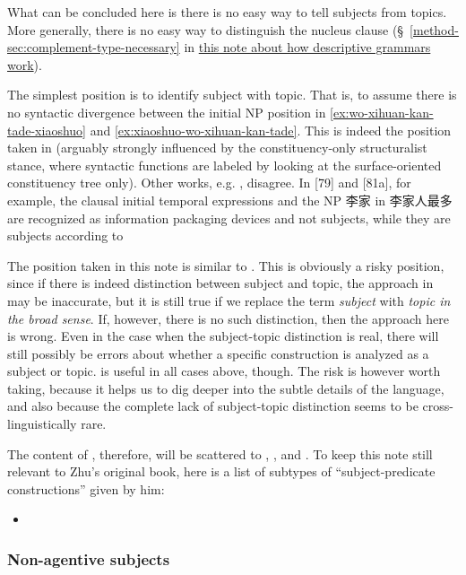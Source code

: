 \documentclass[UTF8, a4paper, oneside, scheme=plain]{ctexart}
\newcommand*{\citesec}[1]{\S~{#1}}
\newcommand*{\citechap}[1]{chap.~{#1}}
\newcommand*{\term}[1]{\emph{#1}}
\newcommand{\method}{\href{../methodology/glossing.pdf}{this note about how descriptive grammars work}}
\begin{document}
What can be concluded here is there is no easy way to tell subjects from topics.
More generally, there is no easy way to distinguish the nucleus clause 
(\citesec{\ref{method-sec:complement-type-necessary}} in \method).

The simplest position is to identify subject with topic.
That is, to assume there is no syntactic divergence 
between the initial NP position in  
\eqref{ex:wo-xihuan-kan-tade-xiaoshuo} and \eqref{ex:xiaoshuo-wo-xihuan-kan-tade}.
This is indeed the position taken in \citep[7.1.3]{zhudexigrammar}
(arguably strongly influenced by the constituency-only structuralist stance,
where syntactic functions are labeled by looking at the surface-oriented constituency tree only).
Other works, e.g. \citet{huang2016reference}, disagree.
In \citet[\citesec{2.6}]{huang2016reference} [79] and [81a],
for example, 
the clausal initial temporal expressions and the NP 李家 in 李家人最多 
are recognized as information packaging devices and not subjects,
while they are subjects according to \citet[\citesec{7.2, 7.9.1}]{zhudexigrammar}

The position taken in this note is similar to \citet{huang2016reference}.
This is obviously a risky position,
since if there is indeed distinction between subject and topic, 
the approach in \citet{zhudexigrammar} may be inaccurate,
but it is still true if we replace the term \term{subject} with \term{topic in the broad sense}.
If, however, there is no such distinction,
then the approach here is wrong.
Even in the case when the subject-topic distinction is real,
there will still possibly be errors about 
whether a specific construction is
analyzed as a subject or topic.
\citet{zhudexigrammar} is useful in all cases above, though.
The risk is however worth taking, 
because it helps us to dig deeper into the subtle details of the language,
and also because the complete lack of subject-topic distinction 
seems to be cross-linguistically rare. %

The content of \citet[\citechap{7}]{zhudexigrammar},
therefore, will be scattered to 
, , and . 
To keep this note still relevant to Zhu's original book,
here is a list of subtypes of ``subject-predicate constructions'' given by him:
\begin{itemize}
    \item 
\end{itemize}

\subsubsection{Non-agentive subjects}
\end{document}
